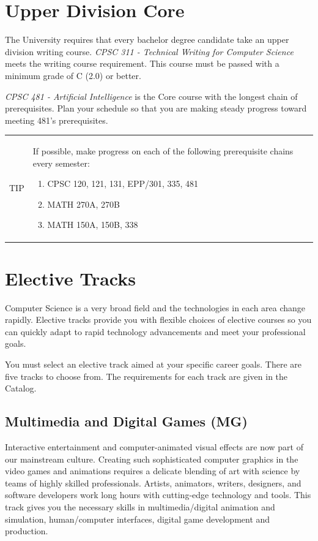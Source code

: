 \documentclass{book}
\newenvironment{tip}{
  \tcolorbox \begin{tabular}{m{.5in} m{5in}} \Large{TIP} &
}{
  \end{tabular} \endtcolorbox
}
\newcommand{\MgTrackName}{Multimedia and Digital Games (MG)}
\begin{document}
\section{Upper Division Core}

The University requires that every bachelor degree candidate take an upper division writing course. \emph{CPSC 311 - Technical Writing for Computer Science} meets the writing course requirement. This course must be passed with a minimum grade of C (2.0) or better.

\emph{CPSC 481 - Artificial Intelligence} is the Core course with the longest chain of prerequisites. Plan your schedule so that you are making steady progress toward meeting 481's prerequisites.

\begin{tip}
  If possible, make progress on each of the following prerequisite chains every semester:
  \begin{enumerate}
  \item CPSC 120, 121, 131, EPP/301, 335, 481
  \item MATH 270A, 270B
  \item MATH 150A, 150B, 338
  \end{enumerate}
\end{tip}

\section{Elective Tracks}
 
Computer Science is a very broad field and the technologies in each area change rapidly. Elective tracks provide you with flexible choices of elective courses so you can quickly adapt to rapid technology advancements and meet your professional goals.

You must select an elective track aimed at your specific career goals. There are five tracks to choose from. The requirements for each track are given in the Catalog.

\subsection{\MgTrackName}
\MgTrackIndex
Interactive entertainment and computer-animated visual effects are now part of our mainstream culture. Creating such sophisticated computer graphics in the video games and animations requires a delicate blending of art with science by teams of highly skilled professionals. Artists, animators, writers, designers, and software developers work long hours with cutting-edge technology and tools. This track gives you the necessary skills in multimedia/digital animation and simulation, human/computer interfaces, digital game development and production.
\end{document}
